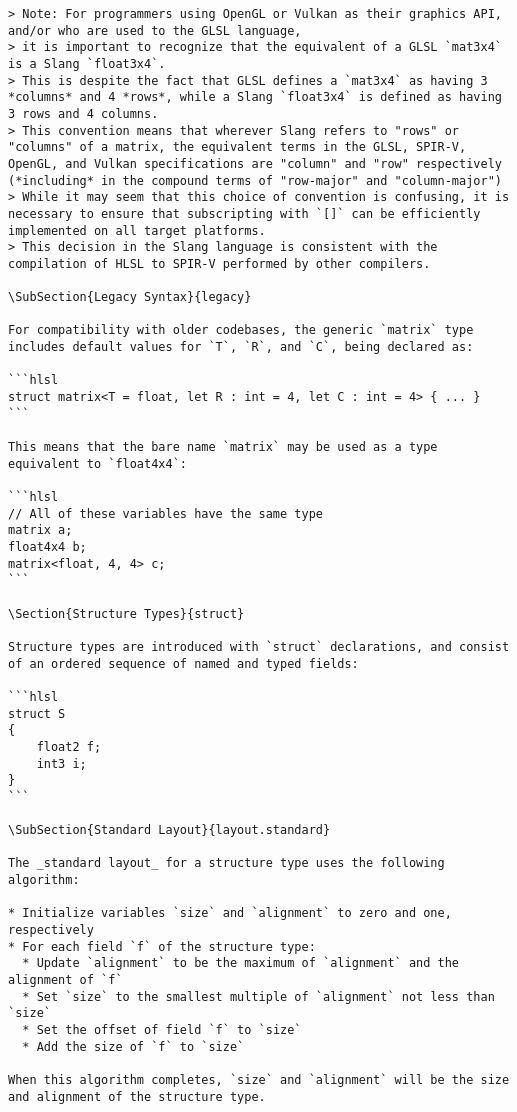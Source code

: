 \begin{verbatim}
> Note: For programmers using OpenGL or Vulkan as their graphics API, and/or who are used to the GLSL language,
> it is important to recognize that the equivalent of a GLSL `mat3x4` is a Slang `float3x4`.
> This is despite the fact that GLSL defines a `mat3x4` as having 3 *columns* and 4 *rows*, while a Slang `float3x4` is defined as having 3 rows and 4 columns.
> This convention means that wherever Slang refers to "rows" or "columns" of a matrix, the equivalent terms in the GLSL, SPIR-V, OpenGL, and Vulkan specifications are "column" and "row" respectively (*including* in the compound terms of "row-major" and "column-major")
> While it may seem that this choice of convention is confusing, it is necessary to ensure that subscripting with `[]` can be efficiently implemented on all target platforms.
> This decision in the Slang language is consistent with the compilation of HLSL to SPIR-V performed by other compilers.

\SubSection{Legacy Syntax}{legacy}

For compatibility with older codebases, the generic `matrix` type includes default values for `T`, `R`, and `C`, being declared as:

```hlsl
struct matrix<T = float, let R : int = 4, let C : int = 4> { ... }
```

This means that the bare name `matrix` may be used as a type equivalent to `float4x4`:

```hlsl
// All of these variables have the same type
matrix a;
float4x4 b;
matrix<float, 4, 4> c;
```

\Section{Structure Types}{struct}

Structure types are introduced with `struct` declarations, and consist of an ordered sequence of named and typed fields:

```hlsl
struct S
{
    float2 f;
    int3 i;
}
```

\SubSection{Standard Layout}{layout.standard}

The _standard layout_ for a structure type uses the following algorithm:

* Initialize variables `size` and `alignment` to zero and one, respectively
* For each field `f` of the structure type:
  * Update `alignment` to be the maximum of `alignment` and the alignment of `f`
  * Set `size` to the smallest multiple of `alignment` not less than `size`
  * Set the offset of field `f` to `size`
  * Add the size of `f` to `size`

When this algorithm completes, `size` and `alignment` will be the size and alignment of the structure type.


\end{verbatim}
